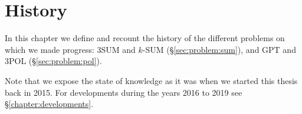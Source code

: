 \chapter{\done History}

In this chapter we define and recount the history of the different problems on
which we made progress:
%
3SUM and \(k\)-SUM (\S\ref{sec:problem:sum}),
and
GPT and 3POL (\S\ref{sec:problem:pol}).

Note that we expose the state of knowledge as it was when we started this
thesis back in 2015. For developments during the years 2016 to 2019 see
\S\ref{chapter:developments}.



